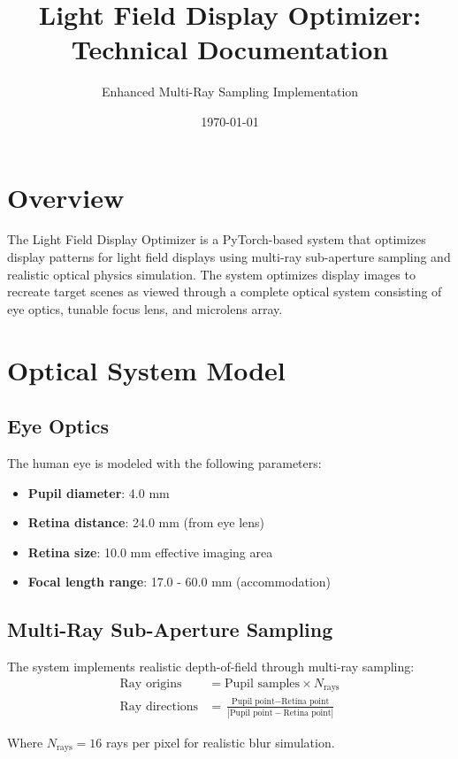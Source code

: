 \documentclass[11pt]{article}
\title{Light Field Display Optimizer: Technical Documentation}
\author{Enhanced Multi-Ray Sampling Implementation}
\date{\today}
\begin{document}
\maketitle

\section{Overview}

The Light Field Display Optimizer is a PyTorch-based system that optimizes display patterns for light field displays using multi-ray sub-aperture sampling and realistic optical physics simulation. The system optimizes display images to recreate target scenes as viewed through a complete optical system consisting of eye optics, tunable focus lens, and microlens array.

\section{Optical System Model}

\subsection{Eye Optics}
The human eye is modeled with the following parameters:
\begin{itemize}
    \item \textbf{Pupil diameter}: 4.0 mm
    \item \textbf{Retina distance}: 24.0 mm (from eye lens)
    \item \textbf{Retina size}: 10.0 mm effective imaging area
    \item \textbf{Focal length range}: 17.0 - 60.0 mm (accommodation)
\end{itemize}

\subsection{Multi-Ray Sub-Aperture Sampling}
The system implements realistic depth-of-field through multi-ray sampling:
\begin{align}
\text{Ray origins} &= \text{Pupil samples} \times N_{\text{rays}} \\
\text{Ray directions} &= \frac{\text{Pupil point} - \text{Retina point}}{|\text{Pupil point} - \text{Retina point}|}
\end{align}

Where $N_{\text{rays}} = 16$ rays per pixel for realistic blur simulation.
\end{document}
